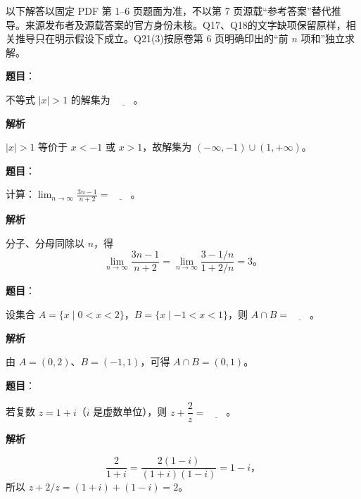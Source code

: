 

\begin{gktip}
以下解答以固定 PDF 第 1–6 页题面为准，不以第 7 页源载“参考答案”替代推导。来源发布者及源载答案的官方身份未核。Q17、Q18的文字缺项保留原样，相关推导只在明示假设下成立。Q21(3)按原卷第 6 页明确印出的“前 $n$ 项和”独立求解。
\end{gktip}

\begin{answer}

\textbf{题目}：

不等式 $|x|>1$ 的解集为 $\underline{\qquad}$。

\textbf{解析}

$|x|>1$ 等价于 $x<-1$ 或 $x>1$，故解集为 $(-\infty,-1)\cup(1,+\infty)$。


\end{answer}
\begin{answer}

\textbf{题目}：

计算：$\displaystyle\lim_{n\to\infty}\frac{3n-1}{n+2}=\underline{\qquad}$。

\textbf{解析}

分子、分母同除以 $n$，得
\nopagebreak[4]
\[
\lim_{n\to\infty}\frac{3n-1}{n+2}
=\lim_{n\to\infty}\frac{3-1/n}{1+2/n}=3\text{。}
\]


\end{answer}
\begin{answer}

\textbf{题目}：

设集合 $A=\{x\mid 0<x<2\}$，$B=\{x\mid -1<x<1\}$，则 $A\cap B=\underline{\qquad}$。

\textbf{解析}

由 $A=(0,2)$、$B=(-1,1)$，可得 $A\cap B=(0,1)$。


\end{answer}
\begin{answer}

\textbf{题目}：

若复数 $z=1+i$（$i$ 是虚数单位），则 $z+\dfrac{2}{z}=\underline{\qquad}$。

\textbf{解析}

\nopagebreak[4]
\[
\frac2{1+i}=\frac{2(1-i)}{(1+i)(1-i)}=1-i\text{，}
\]
所以 $z+2/z=(1+i)+(1-i)=2$。


\end{answer}
